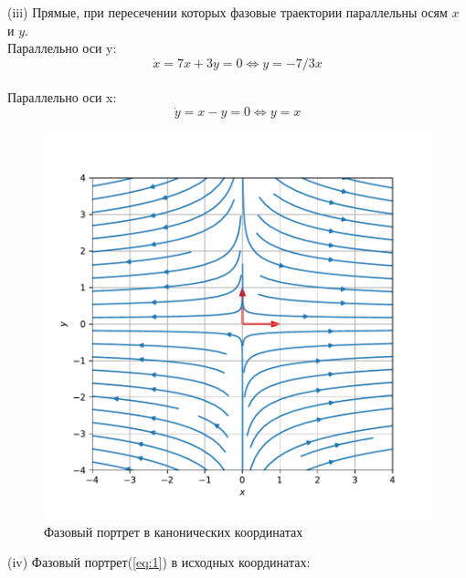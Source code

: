 \documentclass[a4paper, 12pt]{article}
\begin{document}
(iii) Прямые, при пересечении которых фазовые траектории параллельны осям $x$ и $y$.\\
Параллельно оси y:
\[\dot{x} = 7x+3y=0\Leftrightarrow y = -7/3x\]\\
Параллельно оси x:
\[\dot{y} = x-y=0\Leftrightarrow y = x\]
\begin{figure}[H]
	\centering
	\includegraphics[scale=0.8]{2a1_0}
	\caption{Фазовый портрет в канонических координатах}
	\label{im:2a1_0}
\end{figure}



(iv) Фазовый портрет(\ref{eq:1}) в исходных координатах:
\end{document}
